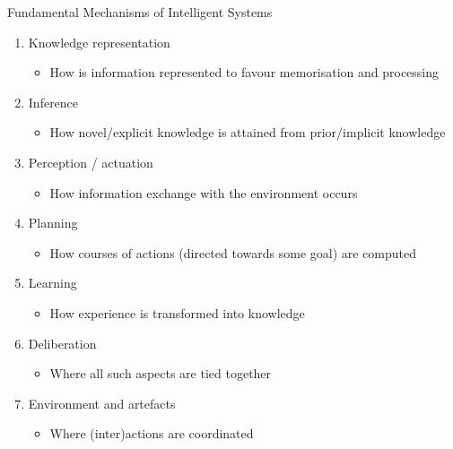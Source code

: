 \documentclass[presentation]{beamer}\mode<presentation>{\usetheme{AMSBolognaFC}}
\begin{document}
\begin{frame}[
    c %
]{Fundamental Mechanisms of Intelligent Systems}
%
\begin{enumerate}
    \item Knowledge representation
    \begin{itemize}
        \item How is information represented to favour memorisation and processing
    \end{itemize}
    \item Inference
    \begin{itemize}
        \item How novel/explicit knowledge is attained from prior/implicit knowledge
    \end{itemize}
    \item Perception / actuation
    \begin{itemize}
        \item How information exchange with the environment occurs
    \end{itemize}
    \item Planning
    \begin{itemize}
        \item How courses of actions (directed towards some goal) are computed
    \end{itemize}
    \item Learning
    \begin{itemize}
        \item How experience is transformed into knowledge
    \end{itemize}
    \item Deliberation
    \begin{itemize}
        \item Where all such aspects are tied together
    \end{itemize}
    \item Environment and artefacts
    \begin{itemize}
        \item Where (inter)actions are coordinated
    \end{itemize}
\end{enumerate}
%

\end{frame}
\end{document}
